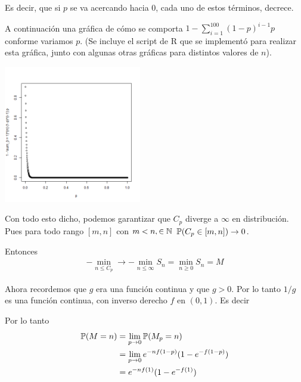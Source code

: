 Es decir, que si $p$ se va acercando hacia 0, cada uno de estos términos, decrece.\par\null

A continuación una gráfica de cómo se comporta $1 - \sum_{i = 1}^{100} (1-p)^{i-1}p$ conforme variamos $p$.
(Se incluye el script de R que se implementó para realizar esta gráfica, junto con algunas otras gráficas para
distintos valores de $n$).\par\null

\begin{center}
    \includegraphics[width=6cm]{tarea2/problema2_1/graficas_inciso2_1_4/probabilidadDeQueC_pSupere100.png}
\end{center}\par\null

Con todo esto dicho, podemos garantizar que $C_p$ diverge a $\infty$ en distribución. Pues para todo rango $[m, n]$ con $m<n,\in \mathbb{N}$
$\mathbb{P}(C_p \in [m, n]) \rightarrow 0$. \par\null

Entonces 
\begin{align}
    - \min_{n \leq C_p} \rightarrow - \min_{n \leq \infty} S_n = \min_{n \geq 0} S_n = M
\end{align}\par\null

Ahora recordemos que $g$ era una función continua y que $g>0$. Por lo tanto $1/g$ es una función continua,
con inverso derecho $f$ en $(0, 1)$. Es decir

Por lo tanto
\begin{align}
    \mathbb{P}(M = n)  &=  \lim_{p \rightarrow 0} \mathbb{P}(M_p = n)                         \\
                &=  \lim_{p \rightarrow 0} e^{-n f(1-p)}(1-e^{- f(1-p)})        \\
                &=   e^{-n f(1)}(1-e^{- f(1)}) \label{problema2_1:distribucion_de_M}
\end{align}

